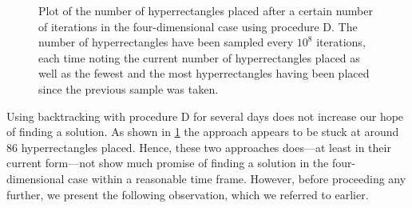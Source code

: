 \begin{figure}[ht]
    \centering
    \caption{Plot of the number of hyperrectangles placed after a certain number of iterations in the four-dimensional case using procedure D. The number of hyperrectangles have been sampled every $10^8$ iterations, each time noting the current number of hyperrectangles placed as well as the fewest and the most hyperrectangles having been placed since the previous sample was taken.}
    \label{fig:backtracking-4d-best}
\end{figure}
Using backtracking with procedure D for several days does not increase our hope of finding a solution. As shown in \cref{fig:backtracking-4d-best} the approach appears to be stuck at around 86 hyperrectangles placed. Hence, these two approaches does---at least in their current form---not show much promise of finding a solution in the four-dimensional case within a reasonable time frame. However, before proceeding any further, we present the following observation, which we referred to earlier.

